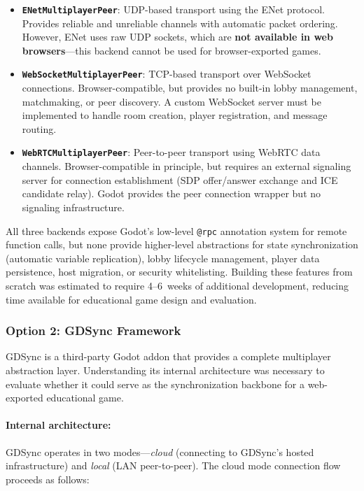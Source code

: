 \begin{itemize}
    \item \textbf{\texttt{ENetMultiplayerPeer}}: UDP-based transport using the ENet protocol. Provides reliable and unreliable channels with automatic packet ordering. However, ENet uses raw UDP sockets, which are \textbf{not available in web browsers}---this backend cannot be used for browser-exported games.
    \item \textbf{\texttt{WebSocketMultiplayerPeer}}: TCP-based transport over WebSocket connections. Browser-compatible, but provides no built-in lobby management, matchmaking, or peer discovery. A custom WebSocket server must be implemented to handle room creation, player registration, and message routing.
    \item \textbf{\texttt{WebRTCMultiplayerPeer}}: Peer-to-peer transport using WebRTC data channels. Browser-compatible in principle, but requires an external signaling server for connection establishment (SDP offer/answer exchange and ICE candidate relay). Godot provides the peer connection wrapper but no signaling infrastructure.
\end{itemize}

All three backends expose Godot's low-level \texttt{@rpc} annotation system for remote function calls, but none provide higher-level abstractions for state synchronization (automatic variable replication), lobby lifecycle management, player data persistence, host migration, or security whitelisting. Building these features from scratch was estimated to require 4--6~weeks of additional development, reducing time available for educational game design and evaluation.

\subsubsection*{Option 2: GDSync Framework}

GDSync \citep{gdsync_framework} is a third-party Godot addon that provides a complete multiplayer abstraction layer. Understanding its internal architecture was necessary to evaluate whether it could serve as the synchronization backbone for a web-exported educational game.

\paragraph*{Internal architecture:}
GDSync operates in two modes---\textit{cloud} (connecting to GDSync's hosted infrastructure) and \textit{local} (LAN peer-to-peer). The cloud mode connection flow proceeds as follows:

